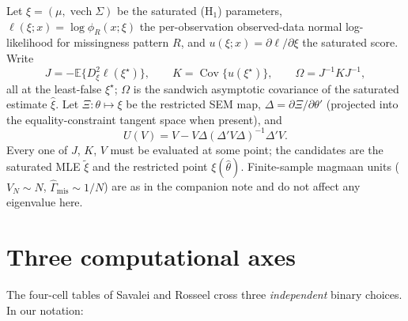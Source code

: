 \documentclass[11pt]{article}
\newcommand{\E}{\mathbb{E}}
\newcommand{\Cov}{\operatorname{Cov}}
\newcommand{\vech}{\operatorname{vech}}
\theoremstyle{plain}
\theoremstyle{remark}
\begin{document}
Let \(\xi=(\mu,\vech\Sigma)\) be the saturated (\(\mathrm{H}_1\)) parameters,
\(\ell(\xi;x)=\log\phi_{R}(x;\xi)\) the per-observation observed-data normal
log-likelihood for missingness pattern \(R\), and
\(u(\xi;x)=\partial\ell/\partial\xi\) the saturated score. Write
\[
  J = -\E\{D^2_\xi\ell(\xi^\star)\},
  \qquad
  K = \Cov\{u(\xi^\star)\},
  \qquad
  \Omega = J^{-1}KJ^{-1},
\]
all at the least-false \(\xi^\star\); \(\Omega\) is the sandwich asymptotic
covariance of the saturated estimate \(\hat\xi\). Let \(\Xi:\theta\mapsto\xi\) be
the restricted SEM map, \(\Delta=\partial\Xi/\partial\theta'\) (projected into
the equality-constraint tangent space when present), and
\[
  U(V) = V - V\Delta(\Delta'V\Delta)^{-1}\Delta'V .
\]
Every one of \(J\), \(K\), \(V\) must be evaluated at some point; the candidates
are the saturated MLE \(\tilde\xi\) and the restricted point \(\xi(\hat\theta)\).
Finite-sample magmaan units (\(V_N\sim N\), \(\hat\Gamma_{\mathrm{mis}}\sim
1/N\)) are as in the companion note and do not affect any eigenvalue here.

\section*{Three computational axes}
\label{sec:axes}

The four-cell tables of Savalei and Rosseel \cite{savaleirosseel2022} cross
three \emph{independent} binary choices. In our notation:
\end{document}
